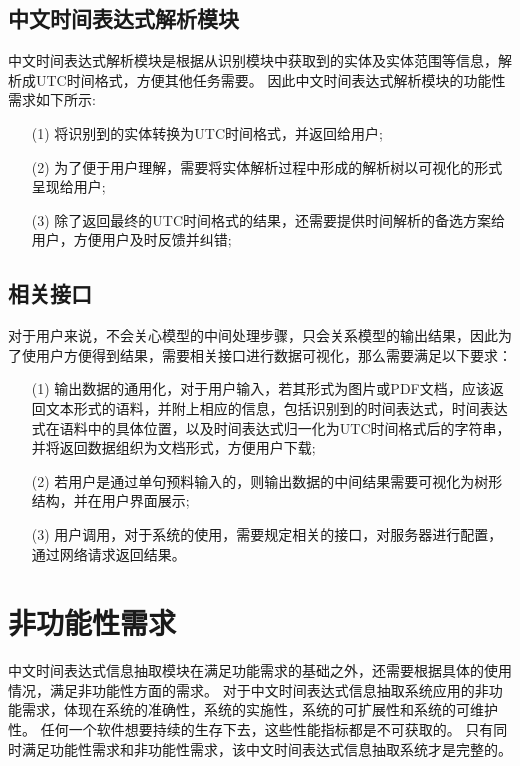 \subsection{中文时间表达式解析模块}

中文时间表达式解析模块是根据从识别模块中获取到的实体及实体范围等信息，解析成UTC时间格式，方便其他任务需要。
因此中文时间表达式解析模块的功能性需求如下所示:
\begin{enumerate}
    \item[(1)] 将识别到的实体转换为UTC时间格式，并返回给用户;
    \item[(2)] 为了便于用户理解，需要将实体解析过程中形成的解析树以可视化的形式呈现给用户;
    \item[(3)] 除了返回最终的UTC时间格式的结果，还需要提供时间解析的备选方案给用户，方便用户及时反馈并纠错;
\end{enumerate}

\subsection{相关接口}

对于用户来说，不会关心模型的中间处理步骤，只会关系模型的输出结果，因此为了使用户方便得到结果，需要相关接口进行数据可视化，那么需要满足以下要求：
\begin{enumerate}
    \item[(1)] 输出数据的通用化，对于用户输入，若其形式为图片或PDF文档，应该返回文本形式的语料，并附上相应的信息，包括识别到的时间表达式，时间表达式在语料中的具体位置，以及时间表达式归一化为UTC时间格式后的字符串，并将返回数据组织为文档形式，方便用户下载;
    \item[(2)] 若用户是通过单句预料输入的，则输出数据的中间结果需要可视化为树形结构，并在用户界面展示;
    \item[(3)]  用户调用，对于系统的使用，需要规定相关的接口，对服务器进行配置，通过网络请求返回结果。
\end{enumerate}

\section{非功能性需求}

中文时间表达式信息抽取模块在满足功能需求的基础之外，还需要根据具体的使用情况，满足非功能性方面的需求。
对于中文时间表达式信息抽取系统应用的非功能需求，体现在系统的准确性，系统的实施性，系统的可扩展性和系统的可维护性。
任何一个软件想要持续的生存下去，这些性能指标都是不可获取的。 只有同时满足功能性需求和非功能性需求，该中文时间表达式信息抽取系统才是完整的。

